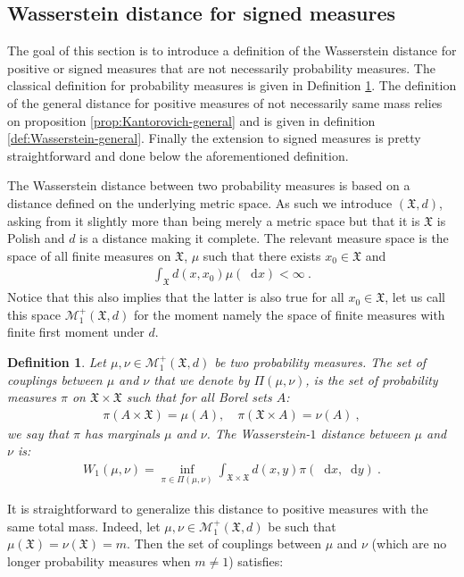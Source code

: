 \documentclass[11pt,a4paper]{article}
\newcommand{\MC}{\mathcal{M}}
\newcommand{\XF}{\mathfrak{X}}
\newcommand{\dd}{\mathop{}\!\mathrm{d}}
\newtheorem{definition}[theorem]{Definition}
\begin{document}
\subsection{Wasserstein distance for signed measures}
The goal of this section is to introduce a definition of the Wasserstein distance for positive or signed measures that are not necessarily probability measures. The classical definition for probability measures is given in Definition \ref{def:Wasserstein}. The definition of the general distance for positive measures of not necessarily same mass relies on proposition \ref{prop:Kantorovich-general} and is given in definition \ref{def:Wasserstein-general}. Finally the extension to signed measures is pretty straightforward and done below the aforementioned definition. 

The Wasserstein distance between two probability measures is based on a distance defined on the underlying metric space. As such we introduce $(\XF,d)$, asking from it slightly more than being merely a metric space but that it is $\XF$ is Polish and $d$ is a distance making it complete. The relevant measure space is the space of all finite measures on $\XF$, $\mu$ such that there exists $x_0 \in \XF$ and 
\begin{align*}
    \int_{\XF} d(x,x_0) \mu(\dd x) < \infty\ .
\end{align*}
Notice that this also implies that the latter is also true for all $x_0 \in \XF$, let us call this space $\MC^+_1(\XF,d)$ for the moment namely the space of finite measures with finite first moment under $d$.
\begin{definition}\label{def:Wasserstein}
    Let $\mu,\nu \in \MC^+_1(\XF,d)$ be two probability measures. The set of couplings between $\mu$ and $\nu$ that we denote by $\Pi(\mu,\nu)$, is the set of probability measures $\pi$ on $\XF\times \XF$ such that for all Borel sets $A$:
    \begin{align*}
        \pi(A\times\XF) = \mu(A) ,\quad  \pi(\XF\times A) = \nu(A)\ ,
    \end{align*}
    we say that $\pi$ has marginals $\mu$ and $\nu$. The Wasserstein-$1$ distance between $\mu$ and $\nu$ is:
    \begin{align*}
        W_1(\mu,\nu) = \inf\limits_{\pi \in\Pi(\mu,\nu)} \int_{\XF\times \XF} d(x,y) \pi(\dd x,\dd y)\ .
    \end{align*}
\end{definition}
It is straightforward to generalize this distance to positive measures with the same total mass. Indeed, let $\mu, \nu \in \MC^+_1(\XF,d)$ be such that $\mu(\XF) = \nu(\XF) = m$. Then the set of couplings between $\mu$ and $\nu$ (which are no longer probability measures when $m \neq 1$) satisfies:
\end{document}
